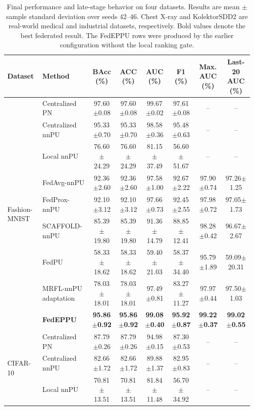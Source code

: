 \documentclass[lettersize,journal]{IEEEtran}
\begin{document}
\begin{table}[!t]
\centering
\caption{Final performance and late-stage behavior on four datasets. Results are mean $\pm$ sample standard deviation over seeds 42--46. Chest X-ray and KolektorSDD2 are real-world medical and industrial datasets, respectively. Bold values denote the best federated result. The FedEPPU rows were produced by the earlier configuration without the local ranking gate.}
\label{tab:overall_results}
\scriptsize
\setlength{\tabcolsep}{3.1pt}
\begin{tabular}{llcccccc}
\toprule
Dataset & Method & BAcc (\%) & ACC (\%) & AUC (\%) & F1 (\%) & Max. AUC (\%) & Last-20 AUC (\%) \\
\midrule
\multirow{9}{*}{Fashion-MNIST}
& Centralized PN & 97.60$\pm$0.08 & 97.60$\pm$0.08 & 99.67$\pm$0.02 & 97.61$\pm$0.08 & -- & -- \\
& Centralized nnPU & 95.33$\pm$0.70 & 95.33$\pm$0.70 & 98.58$\pm$0.36 & 95.48$\pm$0.63 & -- & -- \\
& Local nnPU & 76.60$\pm$24.29 & 76.60$\pm$24.29 & 81.15$\pm$37.49 & 56.60$\pm$51.67 & -- & -- \\
& FedAvg-nnPU & 92.36$\pm$2.60 & 92.36$\pm$2.60 & 97.58$\pm$1.00 & 92.67$\pm$2.22 & 97.90$\pm$0.74 & 97.26$\pm$1.25 \\
& FedProx-nnPU & 92.10$\pm$3.12 & 92.10$\pm$3.12 & 97.66$\pm$0.73 & 92.45$\pm$2.55 & 97.98$\pm$0.72 & 97.05$\pm$1.73 \\
& SCAFFOLD-nnPU & 85.39$\pm$19.80 & 85.39$\pm$19.80 & 91.36$\pm$14.79 & 88.85$\pm$12.41 & 98.28$\pm$0.42 & 96.67$\pm$2.67 \\
& FedPU & 58.33$\pm$18.62 & 58.33$\pm$18.62 & 59.40$\pm$21.03 & 58.37$\pm$34.40 & 95.79$\pm$1.89 & 59.09$\pm$20.31 \\
& MRFL-nnPU adaptation & 78.03$\pm$18.01 & 78.03$\pm$18.01 & 97.49$\pm$0.81 & 83.27$\pm$11.27 & 97.97$\pm$0.44 & 97.50$\pm$1.03 \\
& \textbf{FedEPPU} & \textbf{95.86$\pm$0.92} & \textbf{95.86$\pm$0.92} & \textbf{99.08$\pm$0.40} & \textbf{95.92$\pm$0.87} & \textbf{99.22$\pm$0.37} & \textbf{99.02$\pm$0.55} \\
\midrule
\multirow{9}{*}{CIFAR-10}
& Centralized PN & 87.79$\pm$0.26 & 87.79$\pm$0.26 & 94.98$\pm$0.15 & 87.30$\pm$0.53 & -- & -- \\
& Centralized nnPU & 82.66$\pm$1.72 & 82.66$\pm$1.72 & 89.88$\pm$1.37 & 82.95$\pm$0.83 & -- & -- \\
& Local nnPU & 70.81$\pm$13.51 & 70.81$\pm$13.51 & 81.84$\pm$11.48 & 56.70$\pm$34.92 & -- & -- \\

\end{tabular}
\end{table}
\end{document}
